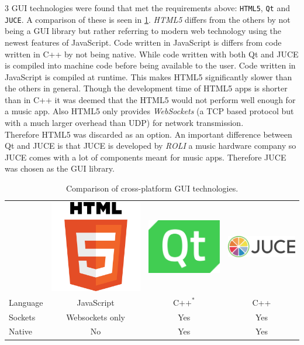 3 GUI technologies were found that met the requirements above: \texttt{HTML5}, \texttt{Qt} and \texttt{JUCE}. A comparison of these is seen in \cref{tab:GUI}. \textit{HTML5} differs from the others by not being a GUI library but rather referring to modern web technology using the newest features of JavaScript. Code written in JavaScript is differs from code written in C++ by not being native. While code written with both Qt and  JUCE is compiled into machine code before being available to the user. Code written in JavaScript is compiled at runtime. This makes HTML5 significantly slower than the others in general. Though the development time of HTML5 apps is shorter than in C++ it was deemed that the HTML5 would not perform well enough for a music app. Also HTML5 only provides \textit{WebSockets} (a TCP based protocol but with a much larger overhead than UDP) for network transmission.\\
Therefore HTML5 was discarded as an option. An important difference between Qt and JUCE is that JUCE is developed by \textit{ROLI} a music hardware company so JUCE comes with a lot of components meant for music apps. Therefore JUCE was chosen as the GUI library.

\begin{table}[H]
\centering
\begin{tabular}{ l c c c }
&
\includegraphics[height=0.1\textwidth]{graphics/html5.png} &
\includegraphics[height=0.1\textwidth]{graphics/qt.png} &
\includegraphics[height=0.1\textwidth]{graphics/juce.png} \\
Language            & JavaScript & $\text{C++}^*$ & C++ \\
Sockets             & Websockets only & Yes & Yes\\
Native & No & Yes & Yes \\
\end{tabular}
\caption{Comparison of cross-platform GUI technologies.}
\label{tab:GUI}
\end{table}

